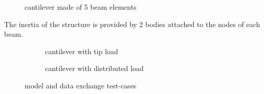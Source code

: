 \begin{figure}[htbp!]
	    \centering
    	\caption{cantilever made of 5 beam elements}
		\label{fig:cnt-beams}
\end{figure}

The inertia of the structure is provided by 2 bodies attached to the nodes of each beam.




\begin{figure}[htbp!]
	    \begin{subfigure}{.8\textwidth}
	    \centering
    	\caption{cantilever with tip load}
		\label{fig:cnt-tip}
	    \end{subfigure}
	    \par\bigskip
	    \begin{subfigure}{.8\textwidth}
		\centering
    	\caption{cantilever with distributed load}
		\label{fig:cnt-distrib}
	    \end{subfigure}
	\caption{model and data exchange test-cases}
\end{figure}








